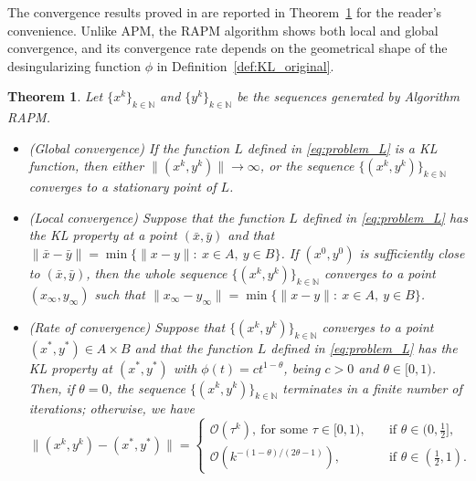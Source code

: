 \documentclass[pdflatex,sn-mathphys-num]{sn-jnl}
\numberwithin{equation}{section}%
\def\N{\mathbb{N}}
\theoremstyle{thmstyleone}%
\newtheorem{theorem}{Theorem}[section]%
\theoremstyle{thmstyletwo}%
\theoremstyle{thmstylethree}%
\begin{document}
The convergence results proved in \cite{attouch2010proximal} are reported in Theorem~\ref{thm:conv_APM_regu} for the reader's convenience. Unlike APM, the RAPM algorithm shows both local and global convergence, and its convergence rate depends on the geometrical shape of the desingularizing function $\phi$ in Definition~\ref{def:KL_original}.

\begin{theorem}\cite[Corollary 3.1, Theorem 3.4]{attouch2010proximal}\label{thm:conv_APM_regu}
    Let $\{x^k\}_{k\in\mathbb{N}}$ and $\{y^k\}_{k\in\mathbb{N}}$ be the sequences generated by Algorithm RAPM.
    \begin{itemize}
        \item[(i)] (Global convergence) If the function $L$ defined in \eqref{eq:problem_L} is a KL function, then either $\|(x^k,y^k)\|\rightarrow \infty$, or the sequence $\{(x^k,y^k)\}_{k\in\mathbb{N}}$ converges to a stationary point of $L$.
        \item[(ii)] (Local convergence) Suppose that the function $L$ defined in \eqref{eq:problem_L} has the KL property at a point $(\bar{x},\bar{y})$ and that $\|\bar{x}-\bar{y}\|=\min\{\|x-y\|: \ x\in A, \ y\in B\}$. If $(x^0,y^0)$ is sufficiently close to $(\bar{x},\bar{y})$, then the whole sequence $\{(x^k,y^k)\}_{k\in\mathbb{N}}$ converges to a point $(x_{\infty},y_{\infty})$ such that $\|x_{\infty}-y_{\infty}\|=\min\{\|x-y\|: \ x\in A, \ y\in B\}$.
        \item[(iii)] (Rate of convergence) Suppose that $\{(x^k,y^k)\}_{k\in\N}$ converges to a point $(x^*,y^*)\in A\times B$ and that the function $L$ defined in \eqref{eq:problem_L} has the KL property at $(x^*,y^*)$ with $\phi(t)=ct^{1-\theta}$, being $c>0$ and $\theta\in[0,1)$. Then, if $\theta=0$, the sequence $\{(x^k,y^k)\}_{k\in\N}$ terminates in a finite number of iterations; otherwise, we have
        \begin{equation*}
            \|(x^k,y^k)-(x^*,y^*)\| = \begin{cases}
               \mathcal{O}(\tau^k), \ \text{for some }\tau\in[0,1), \quad &\text{if }\theta\in(0,\frac{1}{2}],\\
                \mathcal{O}\left(k^{-(1-\theta)/(2\theta-1)}\right), \quad &\text{if }\theta\in(\frac{1}{2},1).
            \end{cases}
        \end{equation*}     
    \end{itemize}
\end{theorem}
\end{document}
